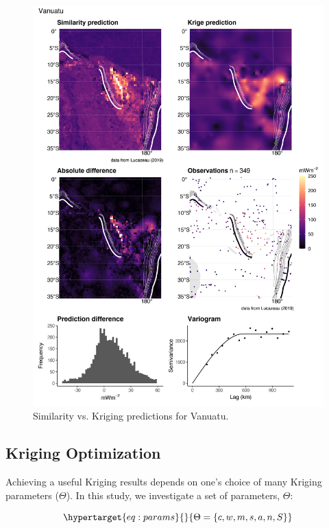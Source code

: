 \documentclass[draft,linenumbers]{agujournal2018}
\begin{document}
\begin{figure}[h]

{\centering \includegraphics[width=0.95\linewidth,]{../figs/diff/comp/Vanuatu} 

}

\caption{Similarity vs. Kriging predictions for Vanuatu.}\label{fig:vanuatu.comp}
\end{figure}

\clearpage

\hypertarget{sec:ga}{%
\subsection{Kriging Optimization}\label{sec:ga}}

Achieving a useful Kriging results depends on one's choice of many
Kriging parameters (\(\Theta\)). In this study, we investigate a set of
parameters, \(\Theta\):

\begin{equation}\protect\hypertarget{eq:params}{}{ \Theta = \{c, w, m, s, a, n, S\} }\label{eq:params}\end{equation}
\end{document}
